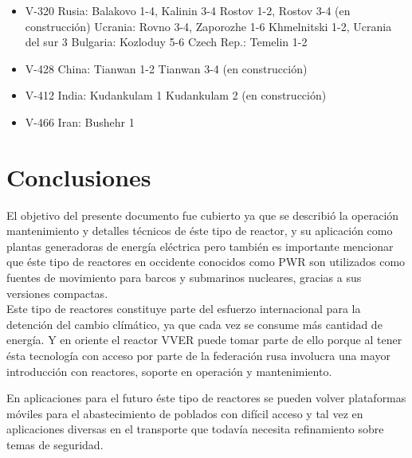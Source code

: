 \documentclass[]{article}
\begin{document}
	
	\begin{multicols}{2}
		\begin{itemize}
			\item V-320
			  \subitem Rusia: Balakovo 1-4, Kalinin 3-4
			  \subitem Rostov 1-2, Rostov 3-4 (en construcción)
			  \subitem Ucrania: Rovno 3-4, Zaporozhe 1-6
			  \subitem Khmelnitski 1-2, Ucrania del sur 3
			  \subitem Bulgaria: Kozloduy 5-6
			  \subitem Czech Rep.: Temelin 1-2
			\item V-428
			   \subitem China: Tianwan 1-2
			   \subitem Tianwan 3-4 (en construcción)
			\item V-412
			  \subitem India: Kudankulam 1 
			  \subitem Kudankulam 2 (en construcción)
			\item V-466
			  \subitem Iran: Bushehr 1
		\end{itemize}
	\end{multicols}
	
\citep{Rosatom}

\section{Conclusiones}

El objetivo del presente documento fue cubierto ya que se describió la operación mantenimiento y detalles técnicos de éste tipo de reactor, y su aplicación como plantas generadoras de energía eléctrica pero también es importante mencionar que éste tipo de reactores en occidente conocidos como PWR son utilizados como fuentes de movimiento para barcos y submarinos nucleares, gracias a sus versiones compactas.\\

Este tipo de reactores constituye parte del esfuerzo internacional para la detención del cambio clímático, ya que cada vez se consume más cantidad de energía. Y en oriente el reactor VVER puede tomar parte de ello porque al tener ésta tecnología con acceso por parte de la federación rusa involucra una mayor introducción con reactores, soporte en operación y mantenimiento.

En aplicaciones para el futuro éste tipo de reactores se pueden volver plataformas móviles para el abastecimiento de poblados con difícil acceso y tal vez en aplicaciones diversas en el transporte que todavía necesita refinamiento sobre temas de seguridad.\\





\end{document}
